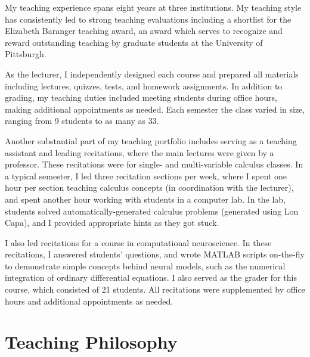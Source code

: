 \documentclass[a4paper,11pt]{article}
\begin{document}
My teaching experience spans eight years at three institutions. My teaching style has consistently led to strong teaching evaluations including a shortlist for the Elizabeth Baranger teaching award, an award which serves to recognize and reward outstanding teaching by graduate students at the University of Pittsburgh.


As the lecturer, I independently designed each course and prepared all materials including lectures, quizzes, tests, and homework assignments. In addition to grading, my teaching duties included meeting students during office hours, making additional appointments as needed. Each semester the class varied in size, ranging from 9 students to as many as 33. 

Another substantial part of my teaching portfolio includes serving as a teaching assistant and leading recitations, where the main lectures were given by a professor. These recitations were for single- and multi-variable calculus classes. In a typical semester, I led three recitation sections per week, where I spent one hour per section teaching calculus concepts (in coordination with the lecturer), and spent another hour working with students in a computer lab. In the lab, students solved automatically-generated calculus problems (generated using Lon Capa), and I provided appropriate hints as they got stuck.

I also led recitations for a course in computational neuroscience. In these recitations, I answered students' questions, and wrote MATLAB scripts on-the-fly to demonstrate simple concepts behind neural models, such as the numerical integration of ordinary differential equations. I also served as the grader for this course, which consisted of 21 students. All recitations were supplemented by office hours and additional appointments as needed.




\section{Teaching Philosophy}
\end{document}
